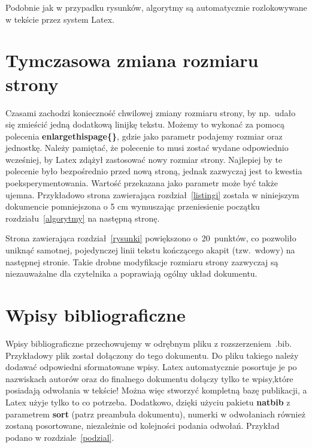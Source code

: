 \documentclass[twoside,a4paper,openright,12pt]{book}
\begin{document}
Podobnie jak w przypadku rysunków, algorytmy są automatycznie rozlokowywane w tekście przez system Latex.


\section{Tymczasowa zmiana rozmiaru strony}

Czasami zachodzi konieczność chwilowej zmiany rozmiaru strony, by np.\ udało się zmieścić jedną dodatkową linijkę tekstu. Możemy to wykonać za pomocą polecenia \textbf{enlargethispage\{\}}, gdzie jako parametr podajemy rozmiar oraz jednostkę. Należy pamiętać, że polecenie to musi zostać wydane odpowiednio wcześniej, by Latex zdążył zastosować nowy rozmiar strony. Najlepiej by te polecenie było bezpośrednio przed nową stroną, jednak zazwyczaj jest to kwestia poeksperymentowania. Wartość przekazana jako parametr może być także ujemna. Przykładowo strona zawierająca rozdział~\ref{listingi} została w niniejszym dokumencie pomniejszona o 5 cm wymuszając przeniesienie początku rozdziału~\ref{algorytmy} na następną stronę.

Strona zawierająca rozdział~\ref{rysunki} powiększono o~20~punktów, co pozwoliło uniknąć samotnej, pojedynczej linii tekstu kończącego akapit (tzw.\ wdowy) na następnej stronie. Takie drobne modyfikacje rozmiaru strony zazwyczaj są niezauważalne dla czytelnika a poprawiają ogólny układ dokumentu.

\section{Wpisy bibliograficzne}

Wpisy bibliograficzne przechowujemy w odrębnym pliku z rozszerzeniem\ .bib. Przykładowy plik został dołączony do tego dokumentu. Do pliku takiego należy dodawać odpowiedni sformatowane wpisy. Latex automatycznie posortuje je po nazwiskach autorów oraz do finalnego dokumentu dołączy tylko te wpisy,które posiadają odwołania w tekście! Można więc stworzyć kompletną bazę publikacji, a Latex użyje tylko to co potrzeba. Dodatkowo, dzięki użyciu pakietu \textbf{natbib} z parametrem \textbf{sort} (patrz preambuła dokumentu), numerki w odwołaniach również zostaną posortowane, niezależnie od kolejności podania odwołań. Przykład podano w rozdziale~\ref{podzial}.


\backmatter

\listoffigures
\lstlistoflistings
\listofalgorithms



\end{document}
